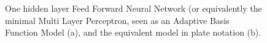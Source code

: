 \begin{figure}
    \centering
    \caption{One hidden layer Feed Forward Neural Network (or equivalently the minimal Multi Layer Perceptron, seen as an Adaptive Basis Function Model (a), and the equivalent model in plate notation (b). }
    \label{fig:mlp}
\end{figure}

